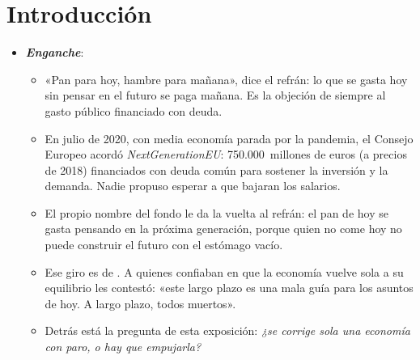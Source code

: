 \documentclass[11pt]{article}
\begin{document}
\tceetitulo

\section*{Introducción}

\begin{itemize}
\item \textbf{\emph{Enganche}}:
  \begin{itemize}
  \item «Pan para hoy, hambre para mañana», dice el refrán: lo que se gasta hoy sin pensar en el futuro se paga mañana. Es la objeción de siempre al gasto público financiado con deuda.
  \item En julio de 2020, con media economía parada por la pandemia, el Consejo Europeo acordó \emph{NextGenerationEU}: 750.000~millones de euros (a precios de 2018) financiados con deuda común para sostener la inversión y la demanda\nocite{CE2026NGEU}. Nadie propuso esperar a que bajaran los salarios.
  \item El propio nombre del fondo le da la vuelta al refrán: el pan de hoy se gasta pensando en la próxima generación, porque quien no come hoy no puede construir el futuro con el estómago vacío.
  \item Ese giro es de . A quienes confiaban en que la economía vuelve sola a su equilibrio les contestó: «este largo plazo es una mala guía para los asuntos de hoy. A largo plazo, todos muertos»\nocite{Keynes1923Tract}.
  \item Detrás está la pregunta de esta exposición: \emph{¿se corrige sola una economía con paro, o hay que empujarla?}
  \end{itemize}


\end{itemize}
\end{document}
